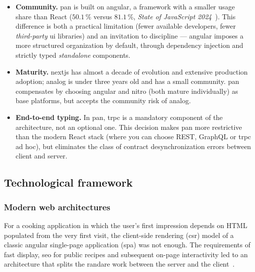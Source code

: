 \begin{itemize}
  \item \textbf{Community.} \gls{pan} is built on \gls{angular}, a framework with a smaller usage share than React (\(50.1\,\%\) versus \(81.1\,\%\), \textit{State of JavaScript 2024}~\cite{stateOfJS2024}). This difference is both a practical limitation (fewer available developers, fewer \textit{third-party} \acrshort{ui} libraries) and an invitation to discipline --- \gls{angular} imposes a more structured organization by default, through dependency injection and strictly typed \textit{standalone} components.

  \item \textbf{Maturity.} \gls{nextjs} has almost a decade of evolution and extensive production adoption; \gls{analog} is under three years old and has a small community. \gls{pan} compensates by choosing \gls{angular} and \gls{nitro} (both mature individually) as base platforms, but accepts the community risk of \gls{analog}.

  \item \textbf{End-to-end typing.} In \gls{pan}, \gls{trpc} is a mandatory component of the architecture, not an optional one. This decision makes \gls{pan} more restrictive than the modern React stack (where you can choose REST, GraphQL or \gls{trpc} ad hoc), but eliminates the class of contract desynchronization errors between client and server.
\end{itemize}

\subsection{Technological framework}\label{sec:cadrul-tehnologic}

\subsubsection{Modern web architectures}\label{subsec:arhitecturi-web}

For a cooking application in which the user's first impression depends on HTML populated from the very first visit, the client-side rendering (\acrshort{csr}) model of a classic \gls{angular} single-page application (\acrshort{spa}) was not enough.
The requirements of fast display, \acrshort{seo} for public recipes and subsequent on-page interactivity led to an architecture that splits the \gls{randare} work between the server and the client~\cite{analog,nitro}.

